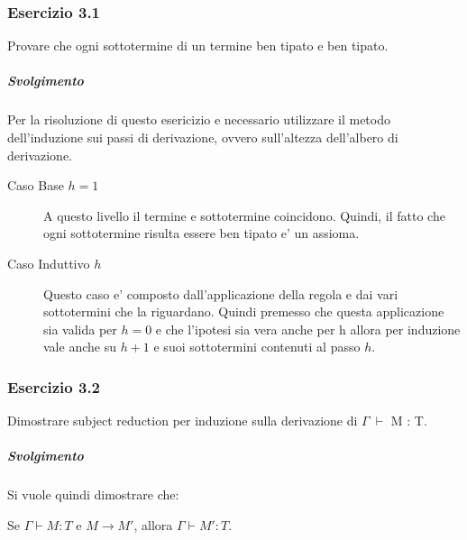  
 
\subsubsection*{Esercizio 3.1}
Provare che ogni sottotermine di un termine ben tipato e ben tipato.
\subparagraph{Svolgimento}
Per la risoluzione di questo esericizio e necessario utilizzare il metodo dell'induzione sui passi di derivazione, ovvero sull'altezza dell'albero di derivazione.

\begin{description}

 \item[Caso Base $h=1$] A questo livello il termine e sottotermine coincidono. Quindi, il fatto che ogni sottotermine risulta essere ben tipato e' un assioma.

 \item[Caso Induttivo $h$ ] Questo caso e' composto dall'applicazione della regola e dai vari sottotermini che la riguardano. Quindi premesso che questa applicazione sia valida per $h = 0$ e che l'ipotesi sia vera anche per h allora per induzione vale anche su $h + 1$ e suoi sottotermini contenuti al passo $h$.
 
 \end{description}
 
\subsubsection*{Esercizio 3.2} 
Dimostrare subject reduction per induzione sulla derivazione di $\Gamma\:\vdash$ M : T.

\subparagraph*{Svolgimento}

Si vuole quindi dimostrare che:

\begin{center}
	Se $\Gamma \vdash{} M : T$ e $M \to{} M'$, allora $\Gamma \vdash{} M' : T$.
\end{center}



